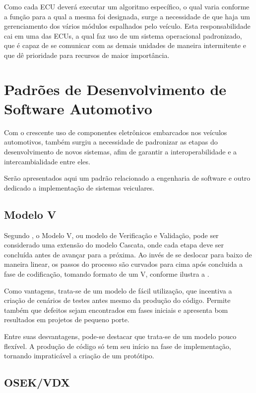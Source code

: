 Como cada ECU deverá executar um algoritmo específico, o qual varia conforme a função para a qual a mesma foi designada, surge a necessidade de que haja um gerenciamento dos vários módulos espalhados pelo veículo. Esta responsabilidade cai em uma das ECUs, a qual faz uso de um sistema operacional padronizado, que é capaz de se comunicar com as demais unidades de maneira intermitente e que dê prioridade para recursos de maior importância.

\section{Padrões de Desenvolvimento de Software Automotivo}

Com o crescente uso de componentes eletrônicos embarcados nos veículos automotivos, também surgiu a necessidade de padronizar as etapas do desenvolvimento de novos sistemas, afim de garantir a interoperabilidade e a intercambialidade entre eles.

Serão apresentados aqui um padrão relacionado a engenharia de software e outro dedicado a implementação de sistemas veiculares.

\subsection{Modelo V}

Segundo , o Modelo V, ou modelo de Verificação e Validação, pode ser considerado uma extensão do modelo Cascata, onde cada etapa deve ser concluída antes de avançar para a próxima. Ao invés de se deslocar para baixo de maneira linear, os passos do processo são curvados para cima após concluida a fase de codificação, tomando formato de um V, conforme ilustra a .


Como vantagens, trata-se de um modelo de fácil utilização, que incentiva a criação de cenários de testes antes mesmo da produção do código. Permite também que defeitos sejam encontrados em fases iniciais e apresenta bom resultados em projetos de pequeno porte.

Entre suas desvantagens, pode-se destacar que trata-se de um modelo pouco flexível. A produção de código só tem seu início na fase de implementação, tornando impraticável a criação de um protótipo.

\subsection{OSEK/VDX}

